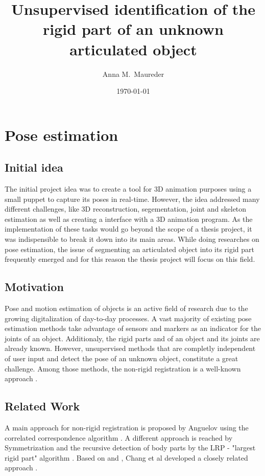 \documentclass[a4paper,english,11pt]{report}
\author{Anna M.\ Maureder}
\title{Unsupervised identification of the rigid part of an unknown articulated object}
\date{\today}
\begin{document}
\maketitle
\tableofcontents

\chapter {Pose estimation}

\section{Initial idea}

The initial project idea was to create a tool for 3D animation purposes using a small puppet to capture its poses in real-time. However, the idea addressed many different challenges, like 3D reconstruction, segementation, joint and skeleton estimation as well as creating a interface with a 3D animation program. As the implementation of these tasks would go beyond the scope of a thesis project, it was indispensible to break it down into its main areas. While doing researches on pose estimation, the issue of segmenting an articulated object into its rigid part frequently emerged and for this reason the thesis project will focus on this field.

\section{Motivation}

Pose and motion estimation of objects is an active field of research due to the growing digitalization of day-to-day processes. A vast majority of existing pose estimation methods take advantage of sensors and markers as an indicator for the joints of an object. Additionaly, the rigid parts and of an object and its joints are already known. However, unsupervised methods that are completly independent of user input and detect the pose of an unknown object, constitute a great challenge. Among those methods, the non-rigid registration is a well-known approach \cite{survey}.

\section{Related Work}
\label{cha:relatedWork}

A main approach for non-rigid registration is proposed by Anguelov \cite{Anguelov04} using the correlated correspondence algorithm \cite{CorrelatedCorrespondance}. A different approach is reached by Symmetrization \cite{Mitra07} and the recursive detection of body parts by the LRP - "largest rigid part" algorithm \cite {guo2016correspondence}. Based on \cite{Anguelov04} and \cite{Mitra07}, Chang et al developed a closely related approach \cite{chang08articulated} \cite{chang09range}.
\end{document}
